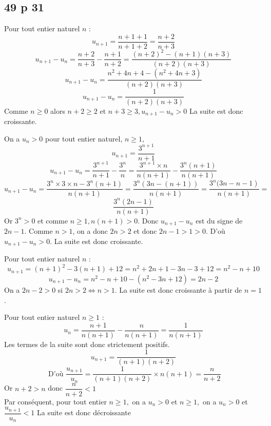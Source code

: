 \documentclass[a4paper,french]{book}
\begin{document}
\subsection*{49 p 31}
\begin{enumMet}
    \item Pour tout entier naturel $n$ :\\
    $$u_{n+1}=\dfrac{n+1+1}{n+1+2}=\dfrac{n+2}{n+3}$$
    $$
    u_{n+1}-u_{n}=\dfrac{n+2}{n+3}-\dfrac{n+1}{n+2}=\dfrac{(n+2)^{2}-(n+1)(n+3)}{(n+2)(n+3)}
    $$
    $$u_{n+1}-u_{n}=\dfrac{n^{2}+4 n+4-\left(n^{2}+4 n+3\right)}{(n+2)(n+3)}$$
    $$u_{n+1}-u_{n}=\dfrac{1}{(n+2)(n+3)}$$
    Comme $n \geq 0$ alors $n+2 \geq 2$ et $n+3 \geq 3, u_{n+1}-u_{n}>0$ La suite est donc croissante.
    \item On a $u_{n}>0$ pour tout entier naturel, $n \geqslant 1$, $$u_{n+1}=\dfrac{3^{n+1}}{n+1}$$
    $$
    u_{n+1}-u_{n}=\dfrac{3^{n+1}}{n+1}-\dfrac{3^{n}}{n}=\dfrac{3^{n+1} \times n}{n(n+1)}-\dfrac{3^{n}(n+1)}{n(n+1)}
    $$
    $$u_{n+1}-u_{n}=\dfrac{3^{n} \times 3 \times n-3^{n}(n+1)}{n(n+1)}=\dfrac{3^{n}(3 n-(n+1))}{n(n+1)}=\dfrac{\left.3^{n}(3 n-n-1\right)}{n(n+1)}=$$
    $$\dfrac{3^{n}(2 n-1)}{n(n+1)}$$
    Or $3^{n}>0$ et comme $n \geq 1, n(n+1)>0$. Donc $u_{n+1}-u_{n}$ est du signe de $2 n-1$. Comme $n>1$, on a donc $2 n>2$ et donc $2 n-1>1>0$. D'où $u_{n+1}-u_{n}>0$. La suite est donc croissante.
    \item Pour tout entier naturel $n$ :
    $$
    u_{n+1}=(n+1)^{2}-3(n+1)+12=n^{2}+2 n+1-3 n-3+12=n^{2}-n+10
    $$
    $$u_{n+1}-u_{n}=n^{2}-n+10-\left(n^{2}-3 n+12\right)=2 n-2$$
    On a $2 n-2>0$ si $2 n>2 \Longleftrightarrow n>1$. La suite est donc croissante à partir de $n=1$.
    \item Pour tout entier naturel $n \geqslant 1$ :
    $$
    u_{n}=\dfrac{n+1}{n(n+1)}-\dfrac{n}{n(n+1)}=\dfrac{1}{n(n+1)}
    $$
    Les termes de la suite sont donc strictement positifs. $$u_{n+1}=\dfrac{1}{(n+1)(n+2)}$$
    $$
    \text { D'où } \dfrac{u_{n+1}}{u_{n}}=\dfrac{1}{(n+1)(n+2)} \times n(n+1)=\dfrac{n}{n+2}
    $$
    Or $n+2>n$ donc $\dfrac{n}{n+2}<1$\\
    Par conséquent, pour tout entier $n \geqslant 1,$ on a $u_{n}>0$ et $n \geqslant 1,$ on a $u_{n}>0$ et $\dfrac{u_{n+1}}{u_{n}}<1$ La suite est donc décroissante
\end{enumMet}
\end{document}
